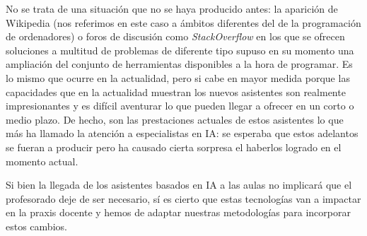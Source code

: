 \documentclass[twocolumn,twoside,a4paper, 10pt]{article}
\begin{document}
No se trata de una situación que no se haya producido antes: la aparición de Wikipedia (nos referimos en este caso 
a ámbitos diferentes del de la programación de ordenadores) o foros de discusión como
\textit{StackOverflow} en los que se ofrecen soluciones a multitud de problemas de diferente tipo supuso en su
momento una ampliación del conjunto de herramientas disponibles a la hora de programar.
Es lo mismo que ocurre en la actualidad, pero si cabe en mayor medida porque las capacidades que en la
actualidad muestran los nuevos asistentes son realmente impresionantes y es difícil aventurar lo que pueden
llegar a ofrecer en un corto o medio plazo.
De hecho, son las prestaciones actuales de estos asistentes lo que más ha llamado la atención a
especialistas en IA: se esperaba que estos adelantos se fueran a producir pero ha causado cierta sorpresa el
haberlos logrado en el momento actual.

Si bien la llegada de los asistentes basados en IA a las aulas no implicará que el profesorado deje de ser
necesario, sí es cierto que estas tecnologías van a impactar en la praxis docente y hemos de adaptar nuestras
metodologías para incorporar estos cambios.

\balance{}




\end{document}
